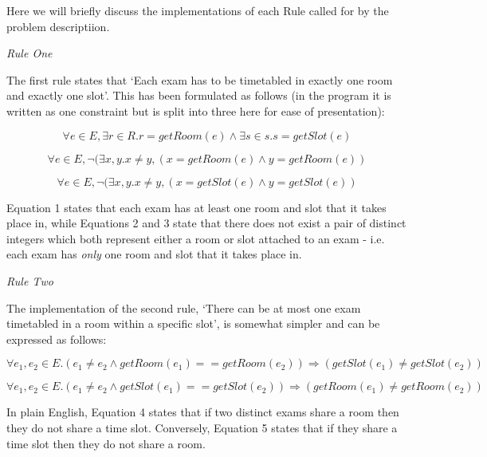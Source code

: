 \documentclass[11pt]{article}
\begin{document}
	Here we will briefly discuss the implementations of each Rule called for by the problem descriptiion.\newline

	\textit{Rule One}

	The first rule states that `Each exam has to be timetabled in exactly one room and exactly one slot'. This has been formulated as follows (in the program it is written as one constraint but is split into three here for ease of presentation):

	\begin{equation}
		\forall e \in E, \exists r \in R . r = getRoom(e) \land \exists s \in s . s = getSlot(e)
	\end{equation}

	\begin{equation}
		\forall e \in E, \lnot(\exists x,y . x \neq y, (x = getRoom(e) \land y = getRoom(e))
	\end{equation}

	\begin{equation}
		\forall e \in E, \lnot(\exists x,y . x \neq y, (x = getSlot(e) \land y = getSlot(e))
	\end{equation}

	Equation 1 states that each exam has at least one room and slot that it takes place in, while Equations 2 and 3 state that there does not exist a pair of distinct integers which both represent either a room or slot attached to an exam - i.e. each exam has \textit{only} one room and slot that it takes place in.\newline

	\textit{Rule Two}

	The implementation of the second rule, `There can be at most one exam timetabled in a room within a specific slot', is somewhat simpler and can be expressed as follows:

	\begin{equation}
		\forall e_1,e_2 \in E . (e_1 \neq e_2 \land getRoom(e_1) == getRoom(e_2)) \Rightarrow (getSlot(e_1) \neq getSlot(e_2))
	\end{equation}

	\begin{equation}
		\forall e_1,e_2 \in E . (e_1 \neq e_2 \land getSlot(e_1) == getSlot(e_2)) \Rightarrow (getRoom(e_1) \neq getRoom(e_2))
	\end{equation}

	In plain English, Equation 4 states that if two distinct exams share a room then they do not share a time slot. Conversely, Equation 5 states that if they share a time slot then they do not share a room.\newline
\end{document}

